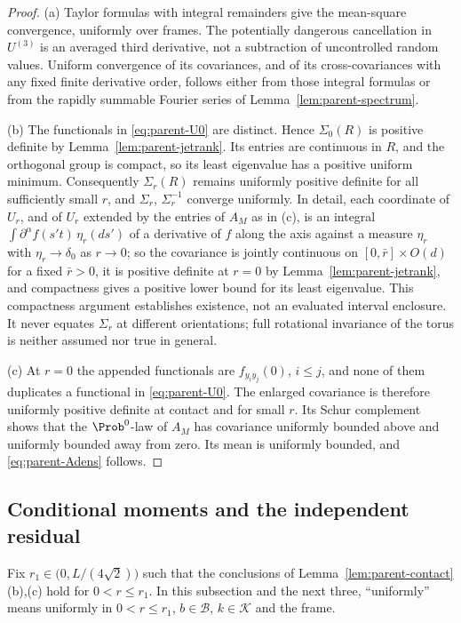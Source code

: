 \begin{proof}
(a) Taylor formulas with integral remainders give the mean-square convergence, uniformly over frames. The potentially dangerous cancellation in $U^{(3)}$ is an averaged third derivative, not a subtraction of uncontrolled random values. Uniform convergence of its covariances, and of its cross-covariances with any fixed finite derivative order, follows either from those integral formulas or from the rapidly summable Fourier series of Lemma~\ref{lem:parent-spectrum}.

(b) The functionals in \eqref{eq:parent-U0} are distinct. Hence $\Sigma_0(R)$ is positive definite by Lemma~\ref{lem:parent-jetrank}. Its entries are continuous in $R$, and the orthogonal group is compact, so its least eigenvalue has a positive uniform minimum. Consequently $\Sigma_r(R)$ remains uniformly positive definite for all sufficiently small $r$, and $\Sigma_r$, $\Sigma_r^{-1}$ converge uniformly. In detail, each coordinate of $U_r$, and of $U_r$ extended by the entries of $A_M$ as in (c), is an integral $\int\partial^\alpha f(s't)\,\eta_r(ds')$ of a derivative of $f$ along the axis against a measure $\eta_r$ with $\eta_r\to\delta_0$ as $r\to0$; so the covariance is jointly continuous on $[0,\bar r]\times O(d)$ for a fixed $\bar r>0$, it is positive definite at $r=0$ by Lemma~\ref{lem:parent-jetrank}, and compactness gives a positive lower bound for its least eigenvalue. This compactness argument establishes existence, not an evaluated interval enclosure. It never equates $\Sigma_r$ at different orientations; full rotational invariance of the torus is neither assumed nor true in general.

(c) At $r=0$ the appended functionals are $f_{y_iy_j}(0)$, $i\le j$, and none of them duplicates a functional in \eqref{eq:parent-U0}. The enlarged covariance is therefore uniformly positive definite at contact and for small $r$. Its Schur complement shows that the $\Prob^0$-law of $A_M$ has covariance uniformly bounded above and uniformly bounded away from zero. Its mean is uniformly bounded, and \eqref{eq:parent-Adens} follows.
\end{proof}

\subsection{Conditional moments and the independent residual}\label{ssec:parent-residual}

Fix $r_1\in\bigl(0,L/(4\sqrt2)\bigr)$ such that the conclusions of Lemma~\ref{lem:parent-contact}(b),(c) hold for $0<r\le r_1$. In this subsection and the next three, ``uniformly'' means uniformly in $0<r\le r_1$, $b\in\mathcal B$, $k\in\mathcal K$ and the frame.

